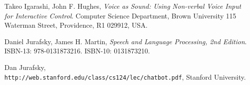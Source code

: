 \documentclass[
	article,			%
	11pt,				%
	oneside,			%
	a4paper,			%
	english,			%
	english,				%
	]{abntex2}
\begin{document}
\medskip

\begin{thebibliography}{9}

Takeo Igarashi, John F. Hughes, 
\textit{Voice as Sound: Using Non-verbal Voice Input for Interactive Control}. 
Computer Science Department, Brown University 115 Waterman Street, Providence, R1 029912, USA.
 
Daniel Jurafsky, James H. Martin, 
\textit{Speech and Language Processing, 2nd Edition}.
ISBN-13: 978-0131873216.
ISBN-10: 0131873210.
 
Dan	Jurafsky, 
\\\texttt{http://web.stanford.edu/class/cs124/lec/chatbot.pdf},
Stanford University.

\end{thebibliography}
 
\end{document}
